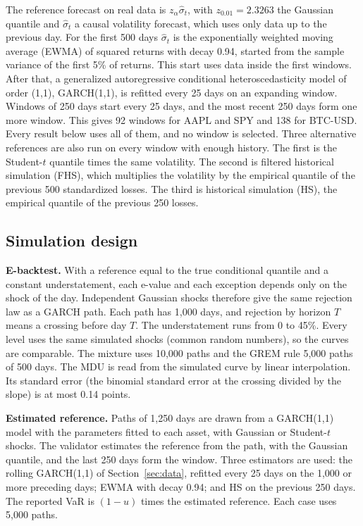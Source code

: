 \documentclass[11pt]{article}
\begin{document}
The reference forecast on real data is $z_\alpha \hat\sigma_t$, with
$z_{0.01} = 2.3263$ the Gaussian quantile and $\hat\sigma_t$ a causal
volatility forecast, which uses only data up to the previous day. For the first 500 days $\hat\sigma_t$ is the exponentially
weighted moving average (EWMA) of squared returns with decay 0.94, started from
the sample variance of the first 5\% of returns. This start uses data inside
the first windows. After that, a
generalized autoregressive conditional heteroscedasticity model of order (1,1),
GARCH(1,1), is refitted every 25 days on an expanding window. Windows of 250
days start every 25 days, and the most recent 250 days form one more window.
This gives 92 windows for AAPL and SPY and 138 for BTC-USD. Every result below
uses all of them, and no window is selected. Three alternative references are
also run on every window with enough history. The first is the Student-$t$
quantile times the same volatility. The second is filtered historical
simulation (FHS), which multiplies the volatility by the empirical quantile of
the previous 500 standardized losses. The third is historical simulation (HS),
the empirical quantile of the previous 250 losses.

\subsection{Simulation design}
\label{sec:simdesign}

\textbf{E-backtest.} With a reference equal to the true conditional quantile
and a constant understatement, each e-value and each exception depends only on
the shock of the day. Independent Gaussian shocks therefore give the same
rejection law as a GARCH path. Each path has 1,000 days, and rejection by horizon $T$
means a crossing before day $T$. The understatement runs from 0 to 45\%. Every
level uses the same simulated shocks (common random numbers), so the curves are
comparable. The mixture uses 10,000 paths and the GREM rule 5,000
paths of 500 days. The MDU is read from the simulated curve by linear
interpolation. Its standard error (the binomial standard error at the crossing divided by the
slope) is at most 0.14 points.

\textbf{Estimated reference.} Paths of 1,250 days are drawn from a GARCH(1,1)
model with the parameters fitted to each asset, with Gaussian or Student-$t$
shocks. The validator estimates the reference from the path, with the Gaussian
quantile, and the last 250 days form the window. Three estimators are
used: the rolling GARCH(1,1) of Section~\ref{sec:data}, refitted every 25 days
on the 1,000 or more preceding days; EWMA with decay 0.94; and HS on the
previous 250 days. The reported VaR is $(1-u)$ times the estimated reference.
Each case uses 5,000 paths.
\end{document}
